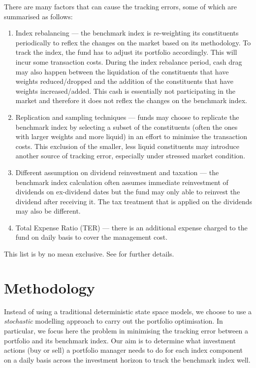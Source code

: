 There are many factors that can cause the tracking errors, some of which are summarised as follows:
\begin{enumerate}
\item Index rebalancing --- the benchmark index is re-weighting its constituents periodically to reflex the changes on the market based on its methodology. To track the index, the fund has to adjust its portfolio accordingly. This will incur some transaction costs. During the index rebalance period, cash drag may also  happen between the liquidation of the constituents that have weights reduced/dropped and the addition of the constituents that have weights increased/added. This cash is essentially not participating in the market and therefore it does not reflex the changes on the benchmark index.
\item Replication and sampling techniques --- funds may choose to replicate the benchmark index by selecting a subset of the constituents (often the ones with larger weights and more liquid) in an effort to minimise the transaction costs. This exclusion of the smaller, less liquid constituents may introduce another source of tracking error, especially under stressed market condition.
\item Different assumption on dividend reinvestment and taxation --- the benchmark index calculation often assumes immediate reinvestment of dividends on ex-dividend dates but the fund may only able to reinvest the dividend after receiving it. The tax treatment that is applied on the dividends may also be different.
\item Total Expense Ratio (TER) --- there is an additional expense charged to the fund on daily basis to cover the management cost.
\end{enumerate}
This list is by no mean exclusive. See \cite{BJ13} for further details.
 
\section{Methodology}
Instead of using a traditional deterministic state space models, we choose to use a \emph{stochastic} modelling approach to carry out the portfolio optimisation. In particular, we focus here the problem in minimising the tracking error between a portfolio and its benchmark index.  Our aim is to determine what investment actions (buy or sell) a portfolio manager needs to do for each index component on a daily basis across the investment horizon to track the benchmark index well.

